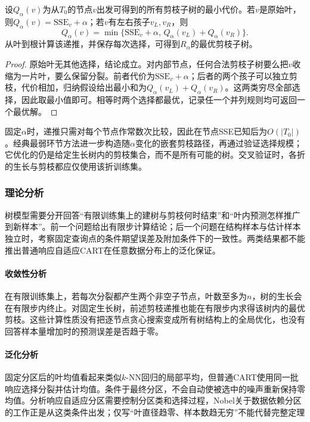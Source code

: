 \begin{theorem}[固定生长树内的最优剪枝]
  \label{thm:regression-pruning}
  设$Q_\alpha(v)$为从$T_0$的节点$v$出发可得到的所有剪枝子树的最小代价。若$v$是原始叶，则$Q_\alpha(v)=\mathrm{SSE}_v+\alpha$；若$v$有左右孩子$v_L,v_R$，则
  \[
    Q_\alpha(v)=\min\{\mathrm{SSE}_v+\alpha,\,
                     Q_\alpha(v_L)+Q_\alpha(v_R)\}.
  \]
  从叶到根计算该递推，并保存每次选择，可得到$R_\alpha$的最优剪枝子树。
\end{theorem}

\begin{proof}
原始叶无其他选择，结论成立。对内部节点，任何合法剪枝子树要么把$v$收缩为一片叶，要么保留分裂。前者代价为$\mathrm{SSE}_v+\alpha$；后者的两个孩子可以独立剪枝，代价相加，归纳假设给出最小和为$Q_\alpha(v_L)+Q_\alpha(v_R)$。这两类穷尽全部选择，因此取最小值即可。相等时两个选择都最优，记录任一个并列规则均可返回一个最优解。
\end{proof}

固定$\alpha$时，递推只需对每个节点作常数次比较，因此在节点SSE已知后为$O(|T_0|)$。经典最弱环节方法进一步构造随$\alpha$变化的嵌套剪枝路径，再通过验证选择规模；它优化的仍是给定生长树内的剪枝集合，而不是所有可能的树。交叉验证时，各折的生长与剪枝都应仅使用该折训练集。

\subsubsection{理论分析}
\label{sec:regression-cart-theory}

树模型需要分开回答“有限训练集上的建树与剪枝何时结束”和“叶内预测怎样推广到新样本”。前一个问题给出有限步计算结论；后一个问题在结构样本与估计样本独立时，考察固定查询点的条件期望误差及附加条件下的一致性。两类结果都不能推出普通响应自适应CART在任意数据分布上的泛化保证。

\paragraph{收敛性分析}
在有限训练集上，若每次分裂都产生两个非空子节点，叶数至多为$n$，树的生长会在有限步内终止。对固定生长树，前述剪枝递推也能在有限步内求得该树内的最优剪枝。这些计算性质没有把逐节点贪心搜索变成所有树结构上的全局优化，也没有回答样本量增加时的预测误差是否趋于零。

\paragraph{泛化分析}
固定分区后的叶均值看起来类似$k$-NN回归的局部平均，但普通CART使用同一批响应选择分裂并估计均值。条件于最终分区，不会自动使被选中的噪声重新保持零均值。分析响应自适应分区需要控制分区类和选择过程，Nobel关于数据依赖分区的工作正是从这类条件出发；仅写“叶直径趋零、样本数趋无穷”不能代替完整定理

